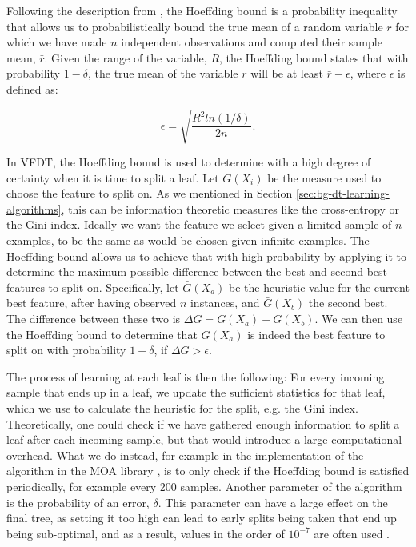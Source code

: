 Following the description from \citet{vfdt}, the Hoeffding bound \cite{hoeffding-bound} is a probability inequality that allows
us to probabilistically bound the true mean of a random variable $r$ for which we have
made $n$ independent observations and computed their sample mean, $\bar{r}$. Given
the range of the variable, $R$, the Hoeffding bound states that with probability
$1-\delta$, the true mean of the variable $r$ will be at least $\bar{r}-\epsilon$, where
$\epsilon$ is defined as:

\begin{equation}
	\epsilon = \sqrt{\frac{R^2ln(1/\delta)}{2n}}.
\end{equation}

In VFDT, the Hoeffding bound is used to determine with a high degree of certainty when
it is time to split a leaf. Let $G(X_i)$ be the measure used to choose the feature
to split on. As we mentioned in Section \ref{sec:bg-dt-learning-algorithms}, this can be
information theoretic measures like the cross-entropy or the Gini index. Ideally we want the feature we select given a limited sample of $n$ examples, to be the same as would be chosen given infinite examples.
The Hoeffding bound allows us to achieve that with high probability by applying
it to determine the maximum possible difference between the best and second best
features to split on. Specifically, let $\bar{G}(X_a)$ be the heuristic value for the
current best feature, after having observed $n$ instances, and $\bar{G}(X_b)$ the second
best. The difference between these two is $\Delta \bar{G} = \bar{G}(X_a) - \bar{G}(X_b)$.
We can then use the Hoeffding bound to determine that $\bar{G}(X_a)$ is indeed the
best feature to split on with probability $1-\delta$, if $\Delta \bar{G} > \epsilon$.

The process of learning at each leaf is then the following: For every incoming sample
that ends up in a leaf, we update the sufficient statistics for that leaf, which we
use to calculate the heuristic for the split, e.g. the Gini index. Theoretically,
one could check if we have gathered enough information to split a leaf after each
incoming sample, but that would introduce a large computational overhead. What we
do instead, for example in the implementation of the algorithm in the MOA library \cite{bifet2010moa},
is to only check if the Hoeffding bound is satisfied periodically, for example
every 200 samples. Another parameter of the algorithm is the probability of an error,
$\delta$. This parameter can have a large effect on the final tree, as setting it
too high can lead to early splits being taken that end up being sub-optimal, and as a result,
values in the order of $10^{-7}$ are often used \cite{data-stream-mining}.

